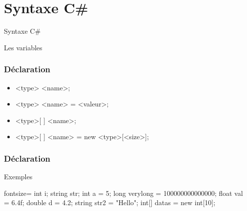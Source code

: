 \section{Syntaxe C\#}

\begingroup
{}
\begin{frame}
    \begin{center}
        \vspace{1cm}
        {\Huge\color{background}
            Syntaxe C\#
        }
    \end{center}
\end{frame}
\endgroup

\begin{frame}
  \begin{center}
    \vspace{1cm}
    {\Huge Les variables}
  \end{center}
\end{frame}

\begin{frame}[c]
  \frametitle{Déclaration}

  \begin{center}
    \begin{itemize}
      \item<+-> <type> <name>;
      \item<+-> <type> <name> = <valeur>;
      \item<+-> <type>[ ] <name>;
      \item<+-> <type>[ ] <name> = new <type>[<size>];
    \end{itemize}
  \end{center}
\end{frame}

\begin{frame}[fragile]
  \frametitle{Déclaration}

  \begin{center}{\large Exemples}\end{center}
  \begin{csharpcode*}{fontsize=\normalsize}
    int i;
    string str;
    int a = 5;
    long verylong = 100000000000000;
    float val = 6.4f;
    double d = 4.2;
    string str2 = "Hello";
    int[] datas = new int[10];
  \end{csharpcode*}
\end{frame}


